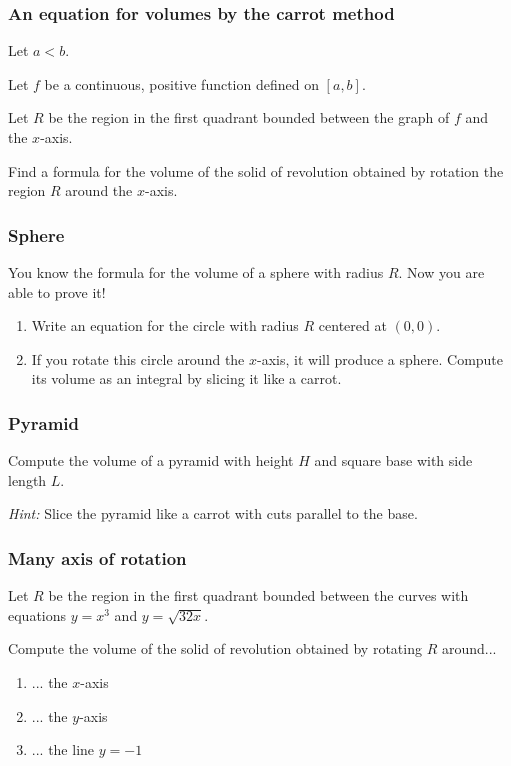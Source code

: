 \begin{frame}[t]
	\frametitle{An equation for volumes by the carrot method}

	Let $a < b$.

	Let $f$ be a continuous, positive function defined on $[a,b]$.

	Let $R$ be the region in the first quadrant bounded between the graph of $f$ and
	the $x$-axis.

	Find a formula for the volume of the solid of revolution obtained by rotation the
	region $R$ around the $x$-axis.
\end{frame}

\begin{frame}[t]
	\frametitle{Sphere}

	You know the formula for the volume of a sphere with radius $R$. Now you are able
	to prove it!

	\begin{enumerate}
		\item Write an equation for the circle with radius $R$ centered at $(0,0)$.

		\item If you rotate this circle around the $x$-axis, it will produce a
			sphere. Compute its volume as an integral by slicing it like a carrot.
	\end{enumerate}
\end{frame}

\begin{frame}[t]
	\frametitle{Pyramid}

	Compute the volume of a pyramid with height $H$ and square base with side
	length $L$.

	\emph{Hint:} Slice the pyramid like a carrot with cuts parallel to the base.
\end{frame}

\begin{frame}[t]
	\frametitle{Many axis of rotation}

	Let $R$ be the region in the first quadrant bounded between the curves with
	equations $\displaystyle y = x^{3}$ and $\displaystyle y=\sqrt{32x}$.

	Compute the volume of the solid of revolution obtained by rotating $R$ around...
	\begin{enumerate}
		\item ... the $x$-axis

		\item ... the $y$-axis

		\item ... the line $y=-1$
	\end{enumerate}
\end{frame}

